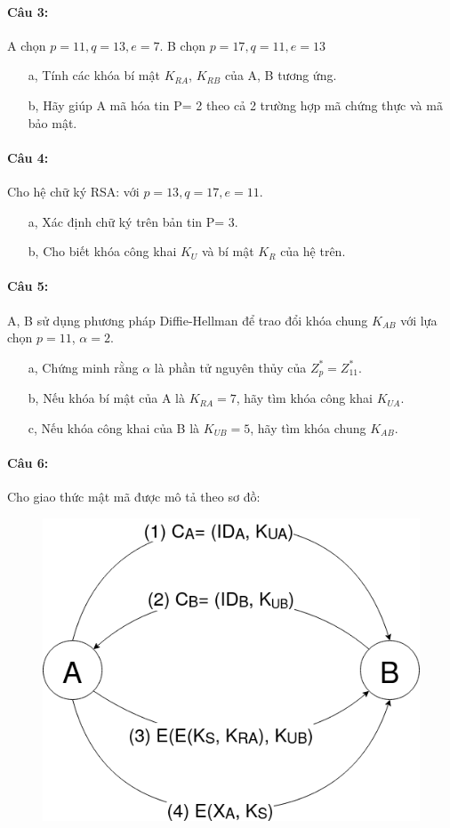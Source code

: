 \documentclass[paper=a4, fontsize=11pt]{scrartcl}
\numberwithin{equation}{section}		%
\numberwithin{figure}{section}			%
\numberwithin{table}{section}				%
\begin{document}
	\paragraph{Câu 3:} A chọn $p= 11, q= 13, e= 7$. B chọn $p= 17, q= 11, e= 13$
	
	\begin{itemize}
		\item[a,] Tính các khóa bí mật $K_{RA}$, $K_{RB}$ của A, B tương ứng.
		\item[b,] Hãy giúp A mã hóa tin P= 2 theo cả 2 trường hợp mã chứng thực và mã bảo mật.
	\end{itemize}
	
	\paragraph{Câu 4:} Cho hệ chữ ký RSA: với $p= 13, q= 17, e= 11$.
	
	\begin{itemize}
		\item[a,] Xác định chữ ký trên bản tin P= 3.
		\item[b,] Cho biết khóa công khai $K_U$ và bí mật $K_R$ của hệ trên.
	\end{itemize}
	
	\paragraph{Câu 5:} A, B sử dụng phương pháp Diffie-Hellman để trao đổi khóa chung $K_{AB}$ với lựa chọn $p= 11$, $\alpha= 2$.
	
	\begin{itemize}
		\item[a,] Chứng minh rằng $\alpha$ là phần tử nguyên thủy của $Z_p^*= Z_{11}^*$.
		\item[b,] Nếu khóa bí mật của A là $K_{RA}= 7$, hãy tìm khóa công khai $K_{UA}$.
		\item[c,] Nếu khóa công khai của B là $K_{UB}= 5$, hãy tìm khóa chung $K_{AB}$.
	\end{itemize}
	
	\paragraph{Câu 6:} Cho giao thức mật mã được mô tả theo sơ đồ:
	\begin{figure}[H]
		\centering
		\includegraphics[width=0.7\linewidth]{SoDoBMTT}
		\label{fig:sodobmtt}
	\end{figure}
	
\end{document}
